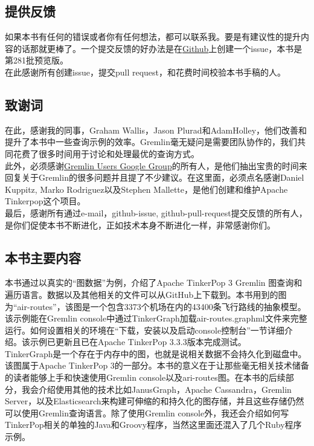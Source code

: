 \documentclass[UTF8]{ctexart}
\begin{document}
\subsection{提供反馈}
\indent 如果本书有任何的错误或者你有任何想法，都可以联系我。要是有建议性的提升内容的话那就更棒了。一个提交反馈的好办法是在\href{https://github.com/krlawrence/graph}{Github}上创建一个issue，本书是第281批预览版。\\
\indent 在此感谢所有创建issue，提交pull request，和花费时间校验本书手稿的人。

\subsection{致谢词}
\indent 在此，感谢我的同事，Graham Wallis，Jason Plurad和AdamHolley，他们改善和提升了本书中一些查询示例的效率。Gremlin毫无疑问是需要团队协作的，我们共同花费了很多时间用于讨论和处理最优的查询方式。\\
\indent 此外，必须感谢\href{https://groups.google.com/forum/#!forum/gremlin-users}{Gremlin Users Google Group}的所有人，是他们抽出宝贵的时间来回复关于Gremlin的很多问题并且提了不少建议。在这里面，必须点名感谢Daniel Kuppitz, Marko Rodriguez以及Stephen Mallette，是他们创建和维护Apache Tinkerpop这个项目。\\
\indent 最后，感谢所有通过e-mail，github-issue, github-pull-request提交反馈的所有人，是你们促使本书不断进化，正如技术本身不断进化一样，非常感谢你们。

\subsection{本书主要内容}
\indent 本书通过以真实的“图数据”为例，介绍了Apache TinkerPop 3 Gremlin 图查询和遍历语言。数据以及其他相关的文件可以从GitHub上下载到。本书用到的图为“air-routes”，该图是一个包含3373个机场在内的43400条飞行路线的抽象模型。该示例能在Gremlin console中通过TinkerGraph加载air-routes.graphml文件来完整运行。如何设置相关的环境在“下载，安装以及启动console控制台”一节详细介绍。该示例已更新且已在Apache TinkerPop 3.3.3版本完成测试。\\

\indent TinkerGraph是一个存在于内存中的图，也就是说相关数据不会持久化到磁盘中。该图属于Apache TinkerPop 3的一部分。本书的意义在于让那些毫无相关技术储备的读者能够上手和快速使用Gremlin console以及ari-routes图。在本书的后续部分，我会介绍使用其他的技术比如JanusGraph，Apache Cassandra，Gremlin Server，以及Elasticsearch来构建可伸缩的和持久化的图存储，并且这些存储仍然可以使用Gremlin查询语言。除了使用Gremlin console外，我还会介绍如何写TinkerPop相关的单独的Java和Groovy程序，当然这里面还混入了几个Ruby程序示例。
\end{document}
